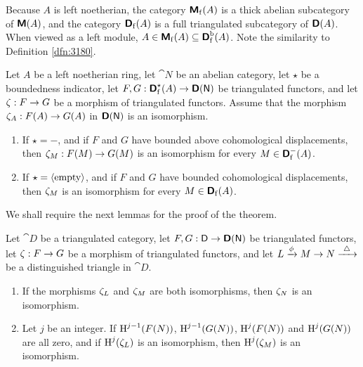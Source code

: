 Because $A$ is left noetherian, the category $\boldsymbol{\mathsf{M}}_{\mathrm{f}}(A)$ is a thick
abelian subcategory of $\boldsymbol{\mathsf{M}}(A)$, and the category $\boldsymbol{\mathsf{D}}_{\mathrm{f}}(A)$ 
is a full triangulated subcategory of $\boldsymbol{\mathsf{D}}(A)$.  
When viewed as a left module, 
$A \in \boldsymbol{\mathsf{M}}_{\mathrm{f}}(A) \subseteq \boldsymbol{\mathsf{D}}_{\mathrm{f}}^{\mathrm{b}}(A)$.
Note the similarity to Definition \ref{dfn:3180}. 

\begin{thm} \label{thm:2135}
Let $A$ be a left noetherian ring, let $\cat{N}$ be an abelian category, 
let $\star$ be a boundedness indicator, let 
$F, G : \boldsymbol{\mathsf{D}}^{\star}_{\mathrm{f}}(A) \to \boldsymbol{\mathsf{D}}(\operatorname{\mathsf{N}})$ 
be triangulated functors, and let 
$\zeta : F \to G$ be a morphism of triangulated functors. Assume that 
the morphism 
$\zeta_A : F(A) \to G(A)$
in $\boldsymbol{\mathsf{D}}(\operatorname{\mathsf{N}})$ is an isomorphism. 
\begin{enumerate}
\item If $\star = -$, and if $F$ and $G$ have bounded above cohomological 
displacements, then 
$\zeta_M : F(M) \to G(M)$
is an isomorphism for every $M \in \boldsymbol{\mathsf{D}}^-_{\mathrm{f}}(A)$.

\item If $\star = \langle \mathrm{empty} \rangle$, and if $F$ and $G$ have bounded 
cohomological displacements, then $\zeta_M$ is an isomorphism for every 
$M \in \boldsymbol{\mathsf{D}}_{\mathrm{f}}(A)$.
\end{enumerate} 
\end{thm}

We shall require the next lemmas for the proof of the theorem. 

\begin{lem} \label{lem:2145}
Let $\cat{D}$ be a triangulated category, let 
$F, G : \operatorname{\mathsf{D}} \to \boldsymbol{\mathsf{D}}(\operatorname{\mathsf{N}})$ be triangulated functors, let 
$\zeta : F \to G$ be a morphism of triangulated functors, and let  
$L \xrightarrow{\phi} M \to N \xrightarrow{ \ \triangle \ }$
be a distinguished triangle in $\cat{D}$.
\begin{enumerate}
\item If the morphisms $\zeta_L$ and $\zeta_M$ are both isomorphisms, then 
$\zeta_N$ is an isomorphism. 

\item Let $j$ be an integer. If $\operatorname{H}^{j - 1}(F(N))$,
$\operatorname{H}^{j - 1}(G(N))$, $\operatorname{H}^{j}(F(N))$ and 
$\operatorname{H}^{j}(G(N))$ are all zero, and if  $\operatorname{H}^{j}(\zeta_L)$
is an isomorphism, then $\operatorname{H}^{j}(\zeta_M)$
is an isomorphism.
\end{enumerate} 
\end{lem}

